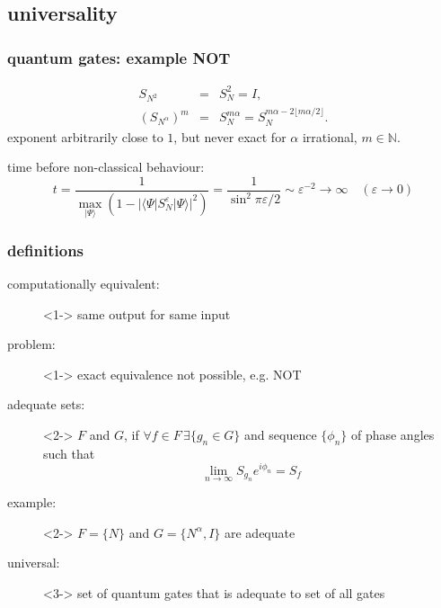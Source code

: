 \documentclass{beamer}
\begin{document}
\subsection{universality}
\begin{frame}
    \frametitle{quantum gates: example NOT}
    \begin{eqnarray}
        S_{N^2}&=&S_N^2=I,\\
        (S_{N^\alpha})^m&=&S_N^{m\alpha}=S_N^{m\alpha-2\lfloor m\alpha/2\rfloor}.
	\end{eqnarray}
	exponent arbitrarily close to $1$, but never exact for $\alpha$ irrational, $m\in\mathbb{N}$.
	\begin{block}{time before non-classical behaviour:}
		\begin{equation*}
			t=\frac{1}{\max_{|\Psi\rangle}(1-|\langle\Psi|S_N^\varepsilon|\Psi\rangle|^2)}= \frac{1}{\sin^2\pi\varepsilon/2}\sim\varepsilon^{-2}\to\infty\quad(\varepsilon\to0)
    	\end{equation*}
	\end{block}
\end{frame}
\begin{frame}
    \frametitle{definitions}
    \begin{description}
    	\item[computationally equivalent:]<1-> same output for same input
		\item[problem:]<1-> exact equivalence not possible, e.g. NOT
        \item[adequate sets:]<2-> $F$ and $G$, if $\forall f\in F\,\exists \{g_n\in
        G\}$ and sequence $\{\phi_n\}$ of phase angles such that
        \begin{equation}
			\lim_{n\to\infty} S_{g_n} e^{i\phi_n}=S_f
		\end{equation}
		\item[example:]<2-> $F=\{N\}$ and $G=\{N^\alpha,I\}$ are adequate
        \item[universal:]<3-> set of quantum gates that is adequate to set of all gates
    \end{description}
\end{frame}
%
\end{document}
